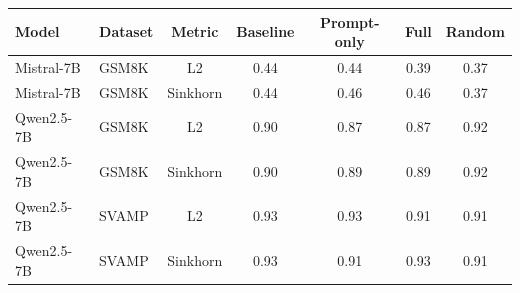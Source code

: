 \begin{tabular}{llccccc}
\toprule
\bf Model & \bf Dataset & \bf Metric & \bf Baseline & \bf Prompt-only & \bf Full & \bf Random \\
\midrule
Mistral-7B & GSM8K & L2 & 0.44 & 0.44 & 0.39 & 0.37 \\
Mistral-7B & GSM8K & Sinkhorn & 0.44 & 0.46 & 0.46 & 0.37 \\
Qwen2.5-7B & GSM8K & L2 & 0.90 & 0.87 & 0.87 & 0.92 \\
Qwen2.5-7B & GSM8K & Sinkhorn & 0.90 & 0.89 & 0.89 & 0.92 \\
Qwen2.5-7B & SVAMP & L2 & 0.93 & 0.93 & 0.91 & 0.91 \\
Qwen2.5-7B & SVAMP & Sinkhorn & 0.93 & 0.91 & 0.93 & 0.91 \\
\bottomrule
\end{tabular}

